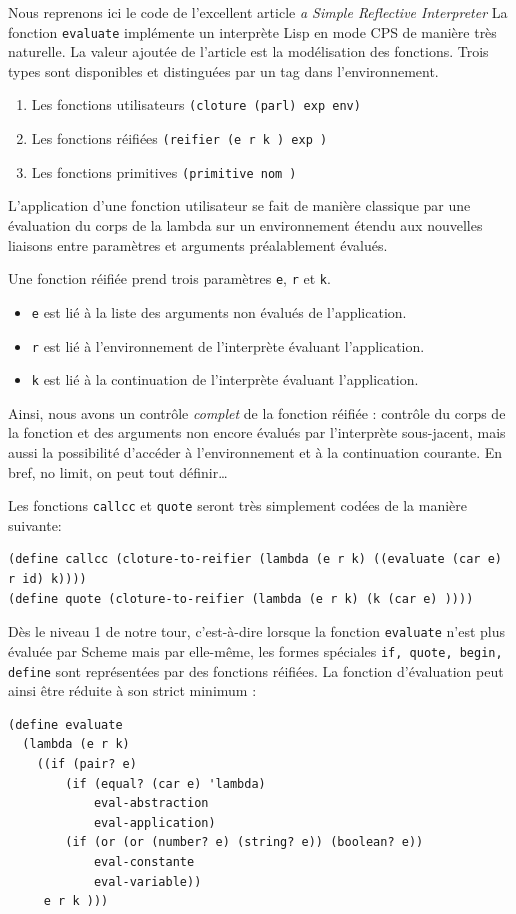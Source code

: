 \documentclass[11pt]{book}
\begin{document}
Nous reprenons ici le code de l'excellent article \textit{a Simple Reflective Interpreter} \cite{reflective}
La fonction \verb+evaluate+ implémente un interprète Lisp en mode CPS de manière très naturelle.
La valeur ajoutée de l'article est la modélisation des fonctions. Trois types sont disponibles et 
distinguées par un tag dans l'environnement.
\begin{enumerate}
  \item Les fonctions utilisateurs \verb+(cloture (parl) exp env)+
  \item Les fonctions réifiées \verb+(reifier (e r k ) exp )+
  \item Les fonctions primitives \verb+(primitive nom )+
\end{enumerate}
L'application d'une fonction utilisateur se fait de manière classique par une évaluation du corps
de la lambda sur un environnement étendu aux nouvelles liaisons entre paramètres et arguments préalablement évalués.

Une fonction réifiée prend trois paramètres \verb+e+, \verb+r+ et \verb+k+.
\begin{itemize}
  \item  \verb+e+ est lié à la liste des arguments non évalués de l'application.
  \item \verb+r+ est lié à l'environnement de l'interprète évaluant l'application.
  \item \verb+k+ est lié à la continuation de l'interprète évaluant l'application.
\end{itemize}
Ainsi, nous avons un contrôle \textit{complet} de la fonction réifiée : contrôle du corps de la fonction et des arguments
non encore évalués par l'interprète sous-jacent, mais aussi la possibilité d'accéder à l'environnement et à la continuation
courante. En bref, no limit, on peut tout définir\dots

Les fonctions \verb+callcc+ et \verb+quote+ seront très simplement codées de la manière suivante:
\begin{Verbatim}
(define callcc (cloture-to-reifier (lambda (e r k) ((evaluate (car e) r id) k))))
(define quote (cloture-to-reifier (lambda (e r k) (k (car e) ))))
\end{Verbatim}


Dès le niveau 1 de notre tour, c'est-à-dire lorsque la fonction \verb+evaluate+ n'est plus évaluée par Scheme 
mais par elle-même, les formes spéciales \verb+if, quote, begin, define+ sont représentées par des fonctions réifiées.
La fonction d'évaluation peut ainsi être réduite à son strict minimum :
\begin{Verbatim}
(define evaluate
  (lambda (e r k)
    ((if (pair? e)
        (if (equal? (car e) 'lambda)
            eval-abstraction
            eval-application)
        (if (or (or (number? e) (string? e)) (boolean? e))
            eval-constante
            eval-variable))  
     e r k )))
\end{Verbatim}
\end{document}
